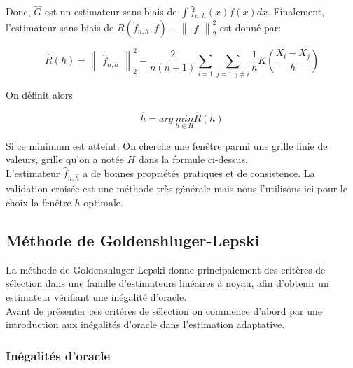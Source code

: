 \documentclass[
]{book}
\theoremstyle{definition}
\theoremstyle{definition}
\theoremstyle{definition}
\theoremstyle{definition}
\theoremstyle{remark}
\begin{document}
Donc, \(\hat{G}\) est un estimateur sans biais de \(\int\hat{f}_{n,h}(x)f(x)dx\). Finalement, l'estimateur sans biais de \(R(\hat{f}_{n,h}, f)-\begin{Vmatrix}{f}\end{Vmatrix}_2^2\) est donné par:

\[
\hat{R}(h)=\begin{Vmatrix}\hat{f}_{n,h}\end{Vmatrix}_2^2-\frac{2}{n(n-1)}\sum_{i=1}\sum_{j=1,j\ne i}\frac{1}{h}K(\frac{X_i-X_j}{h})
\]

On définit alors

\[
\hat{h} = arg\ \underset{h\in H}{min}\hat{R}(h)
\]

Si ce minimum est atteint. On cherche une fenêtre parmi une grille finie de valeurs, grille qu'on a notée \(H\) dans la formule ci-dessus.\\
L'estimateur \(\hat{f}_{n,\hat{h}}\) a de bonnes propriétés pratiques et de consistence.
La validation croisée est une méthode très générale mais nous l'utilisons ici pour le choix la fenêtre \(h\) optimale.

\hypertarget{muxe9thode-de-goldenshluger-lepski}{%
\subsection{Méthode de Goldenshluger-Lepski}\label{muxe9thode-de-goldenshluger-lepski}}

La méthode de Goldenshluger-Lepski donne principalement des critères de sélection dans une famille d'estimateurs linéaires à noyau, afin d'obtenir un estimateur vérifiant une inégalité d'oracle.\\
Avant de présenter ces critéres de sélection on commence d'abord par une introduction aux inégalités d'oracle dans l'estimation adaptative.

\hypertarget{inuxe9galituxe9s-doracle}{%
\subsubsection{Inégalités d'oracle}\label{inuxe9galituxe9s-doracle}}
\end{document}
